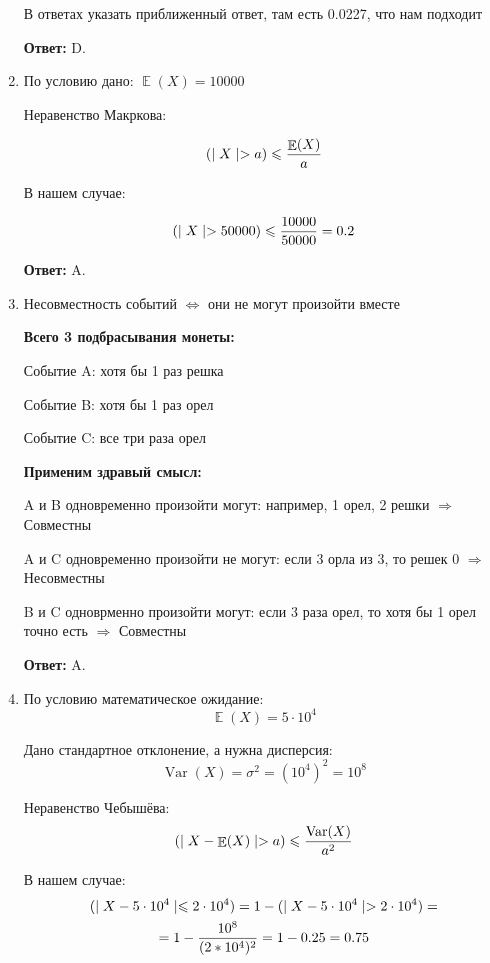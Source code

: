 \documentclass[a4paper]{article} %
\DeclareMathOperator{\Var}{Var}
\DeclareMathOperator{\E}{\mathbb{E}}
\let\P\relax
\DeclareMathOperator{\P}{\mathbb{P}}
\renewcommand{\leq}{\leqslant}
\begin{document}
\begin{enumerate}
    В ответах указать приближенный ответ, там есть 0.0227, что нам подходит
    
    \textbf{Ответ:} D.
    
    
    \item
    По условию дано: $\E(X) = 10000$
    
    Неравенство Макркова:
    
    \[
    \P(\mid X \mid > a) \leq \frac{\E(X)}{a}
    \]
    
    В нашем случае:
    
    \[
    \P(\mid X \mid > 50000) \leq \frac{10000}{50000} = 0.2
    \]
    
    \textbf{Ответ:} A.
    
    
    \item
    Несовместность событий $\Leftrightarrow$ они не могут произойти вместе
    
    \textbf{Всего 3 подбрасывания монеты:}
    
    Событие A: хотя бы 1 раз решка

    Событие B: хотя бы 1 раз орел

    Событие C: все три раза орел
    
    \textbf{Применим здравый смысл:}
    
    A и B одновременно произойти могут: например, 1 орел, 2 решки $\Rightarrow$ Совместны
    
    A и C одновременно произойти не могут: если 3 орла из 3, то решек 0 $\Rightarrow$ Несовместны
    
    B и C одноврменно произойти могут: если 3 раза орел, то хотя бы 1 орел точно есть $\Rightarrow$ Совместны
    
    \textbf{Ответ:} A.
    
    
    \item
    По условию математическое ожидание:
    \[
    \E(X) = 5\cdot10^4
    \]
    
    Дано стандартное отклонение, а нужна дисперсия:
    \[
    \Var(X) = \sigma^2 = (10^4)^2 = 10^8
    \]
    
    Неравенство Чебышёва:
    \[
    \P(\mid X - \E(X) \mid > a) \leq \frac{\Var(X)}{a^2}
    \]
    
    В нашем случае:
    \[
    \begin{gathered} \P(\mid X - 5\cdot10^4 \mid \leq 2\cdot10^4) = 1 -  \P(\mid X - 5\cdot10^4 \mid > 2\cdot10^4) = \\
    =1 - \frac{10^8}{(2* 10^4)^2} = 1 - 0.25 = 0.75 \end{gathered}
    \]
    

\end{enumerate}
\end{document}
